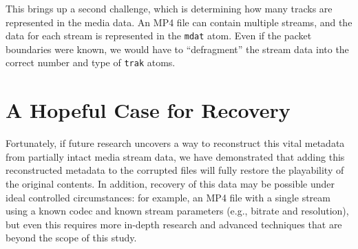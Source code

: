 This brings up a second challenge, which is determining how many tracks are represented in the media data. An MP4 file can contain multiple streams, and the data for each stream is represented in the \texttt{mdat} atom. Even if the packet boundaries were known, we would have to ``defragment'' the stream data into the correct number and type of \texttt{trak} atoms.

\section{A Hopeful Case for Recovery}

Fortunately, if future research uncovers a way to reconstruct this vital metadata from partially intact media stream data, we have demonstrated that adding this reconstructed metadata to the corrupted files will fully restore the playability of the original contents. In addition, recovery of this data may be possible under ideal controlled circumstances: for example, an MP4 file with a single stream using a known codec and known stream parameters (e.g., bitrate and resolution), but even this requires more in-depth research and advanced techniques that are beyond the scope of this study.

